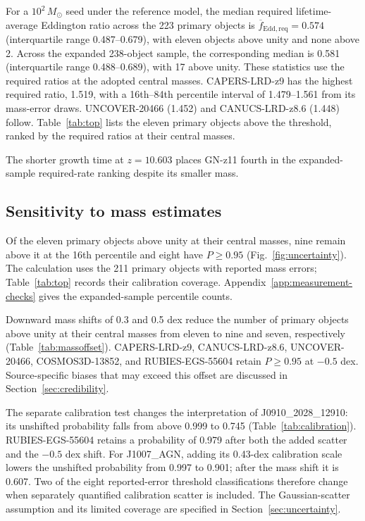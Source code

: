 \documentclass[pdflatex,sn-basic]{sn-jnl}
\begin{document}
For a $10^2\,M_\odot$ seed under the reference model, the median required
lifetime-average Eddington ratio across the 223 primary objects is
$\overline{f}_{\mathrm{Edd,req}}=0.574$ (interquartile range 0.487--0.679),
with eleven objects above unity and none above 2. Across the expanded
238-object sample, the corresponding median is 0.581 (interquartile range
0.488--0.689), with 17 above unity. These statistics use the required ratios
at the adopted central masses.
CAPERS-LRD-z9 has the highest required ratio, 1.519,
with a 16th--84th percentile interval of 1.479--1.561 from its mass-error draws.
UNCOVER-20466 (1.452) and CANUCS-LRD-z8.6 (1.448) follow.
Table~\ref{tab:top} lists the eleven primary objects above the threshold,
ranked by the required ratios at their central masses.

The shorter growth time at $z=10.603$ places GN-z11 fourth in the expanded-sample
required-rate ranking despite its smaller mass.




\subsection{Sensitivity to mass estimates}

Of the eleven primary objects above unity at their central masses, nine
remain above it at the 16th percentile and eight have $P\geq0.95$
(Fig.~\ref{fig:uncertainty}). The calculation uses the 211 primary objects with reported mass errors;
Table~\ref{tab:top} records their calibration coverage. Appendix~\ref{app:measurement-checks} gives the expanded-sample
percentile counts.




Downward mass shifts of 0.3 and 0.5 dex reduce the number of primary objects
above unity at their central masses from eleven to nine and seven, respectively
(Table~\ref{tab:massoffset}). CAPERS-LRD-z9, CANUCS-LRD-z8.6, UNCOVER-20466, COSMOS3D-13852, and
\mbox{RUBIES-EGS-55604} retain $P\geq0.95$ at $-0.5$ dex. Source-specific biases that may exceed this
offset are discussed in Section~\ref{sec:credibility}.




The separate calibration test changes the interpretation of
J0910\_2028\_12910: its unshifted probability falls from above 0.999 to 0.745
(Table~\ref{tab:calibration}). RUBIES-EGS-55604 retains a probability of
0.979 after both the added scatter and the $-0.5$ dex shift. For J1007\_AGN,
adding its 0.43-dex calibration scale lowers the unshifted probability from
0.997 to 0.901; after the mass shift it is 0.607. Two of the eight reported-error threshold classifications therefore change
when separately quantified calibration scatter is included. The Gaussian-scatter assumption and its limited
coverage are specified in Section~\ref{sec:uncertainty}.
\end{document}
